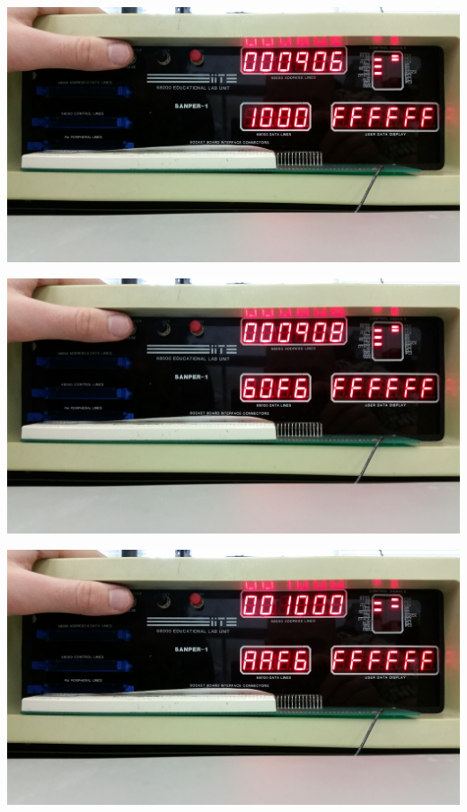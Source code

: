 \documentclass[12pt, twocolumn]{article}
\begin{document}
\begin{center}
\includegraphics[width=1\linewidth]{Lab1/20150120_094142}
\end{center}
\begin{center}
\includegraphics[width=1\linewidth]{Lab1/20150120_094143}
\end{center}
\begin{center}
\includegraphics[width=1\linewidth]{Lab1/20150120_094147}
\end{center}
\end{document}
